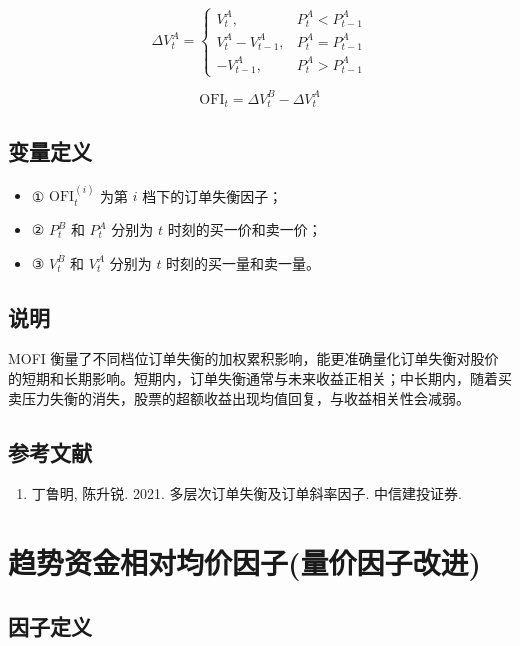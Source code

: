 \documentclass{article}
\begin{document}
\begin{equation}
    \Delta V_t^A = 
    \begin{cases} 
        V_t^A, & P_t^A < P_{t-1}^A \\ 
        V_t^A - V_{t-1}^A, & P_t^A = P_{t-1}^A \\ 
        -V_{t-1}^A, & P_t^A > P_{t-1}^A 
    \end{cases}
\end{equation}

\begin{equation}
    \mathrm{OFI}_t = \Delta V_t^B - \Delta V_t^A
\end{equation}

\subsection{变量定义}
\begin{itemize}
    \item ① \( \mathrm{OFI}_t^{(i)} \) 为第 \( i \) 档下的订单失衡因子；
    \item ② \( P_t^B \) 和 \( P_t^A \) 分别为 \( t \) 时刻的买一价和卖一价；
    \item ③ \( V_t^B \) 和 \( V_t^A \) 分别为 \( t \) 时刻的买一量和卖一量。
\end{itemize}

\subsection{说明}
MOFI 衡量了不同档位订单失衡的加权累积影响，能更准确量化订单失衡对股价的短期和长期影响。短期内，订单失衡通常与未来收益正相关；中长期内，随着买卖压力失衡的消失，股票的超额收益出现均值回复，与收益相关性会减弱。

\subsection{参考文献}
\begin{enumerate}
    \item 丁鲁明, 陈升锐. 2021. 多层次订单失衡及订单斜率因子. 中信建投证券.
\end{enumerate}

\section{趋势资金相对均价因子(量价因子改进)}

\subsection{因子定义}
\end{document}
